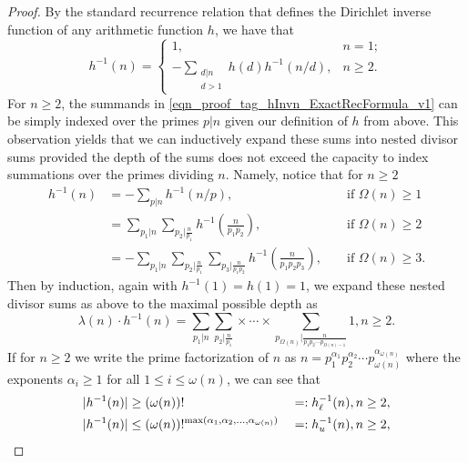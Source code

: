 \documentclass[11pt,reqno,a4letter]{article}
\numberwithin{figure}{section}
\numberwithin{table}{section}
\theoremstyle{plain}
\numberwithin{theorem}{section}
\theoremstyle{definition}
\begin{document}
\begin{proof}
By the standard recurrence relation that defines the Dirichlet inverse function of any 
arithmetic function $h$, we have that \cite[\S 2.7]{APOSTOLANUMT} 
\begin{equation} 
\label{eqn_proof_tag_hInvn_ExactRecFormula_v1}
h^{-1}(n) = \begin{cases} 
            1, & n = 1; \\ 
            -\sum\limits_{\substack{d|n \\ d>1}} h(d) h^{-1}(n/d), & n \geq 2. 
            \end{cases} 
\end{equation} 
For $n \geq 2$, the summands in \eqref{eqn_proof_tag_hInvn_ExactRecFormula_v1} 
can be simply indexed over the primes $p|n$ given our definition of $h$ from above. 
This observation yields that we can inductively 
expand these sums into nested divisor sums provided the depth of the sums does not exceed the 
capacity to index summations over the primes dividing $n$. Namely, notice that for $n \geq 2$ 
\begin{align*} 
h^{-1}(n) & = -\sum_{p|n} h^{-1}(n/p), && \text{\ if\ } \Omega(n) \geq 1 \\ 
     & = \sum_{p_1|n} \sum_{p_2|\frac{n}{p_1}} h^{-1}\left(\frac{n}{p_1p_2}\right), && \text{\ if\ } \Omega(n) \geq 2 \\ 
     & = -\sum_{p_1|n} \sum_{p_2|\frac{n}{p_1}} \sum_{p_3|\frac{n}{p_1p_2}} h^{-1}\left(\frac{n}{p_1p_2p_3}\right), 
     && \text{\ if\ } \Omega(n) \geq 3. 
\end{align*} 
Then by induction, again with $h^{-1}(1) = h(1) = 1$, we expand these 
nested divisor sums as above to the maximal possible depth as 
\begin{equation} 
\label{eqn_proof_tag_hInvn_ExactNestedSumFormula_v2} 
\lambda(n) \cdot h^{-1}(n) = \sum_{p_1|n} \sum_{p_2|\frac{n}{p_1}} \times \cdots \times 
     \sum_{p_{\Omega(n)}|\frac{n}{p_1p_2 \cdots p_{\Omega(n)-1}}} 1, n \geq 2. 
\end{equation} 
If for $n \geq 2$ we write the prime factorization of $n$ as 
$n = p_1^{\alpha_1} p_2^{\alpha_2} \cdots p_{\omega(n)}^{\alpha_{\omega(n)}}$ where the exponents $\alpha_i \geq 1$ 
for all $1 \leq i \leq \omega(n)$, we can see that 
\begin{align} 
\label{eqn_proof_tag_hInvn_AbsBounds_v3} 
|h^{-1}(n)| & \geq (\omega(n))! && =: h_{\ell}^{-1}(n), n \geq 2, \\ 
\notag 
|h^{-1}(n)| & \leq (\omega(n))!^{\max(\alpha_1, \alpha_2, \ldots, \alpha_{\omega(n)})} && =: h_u^{-1}(n), n \geq 2, 

\end{align}
\end{proof}
\end{document}
